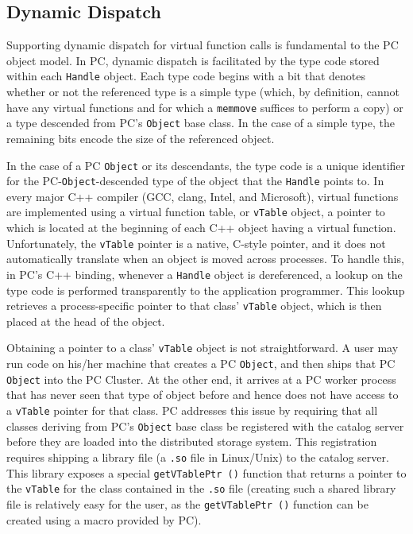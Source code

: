 \subsection{Dynamic Dispatch}
\label{sec:dyn_dis}

Supporting dynamic dispatch for virtual function calls is fundamental to the PC object model.
In PC, dynamic dispatch is facilitated by the type code stored within each
\texttt{Handle} object.
Each type code begins with a bit that denotes whether or not the referenced type is a simple type (which, by definition, cannot have any
virtual functions and for which a \texttt{memmove} suffices to perform a copy) or a type descended from PC's \texttt{Object} base class.
In the case of a simple type, the remaining bits encode the size of the referenced object.  

In the case of a PC \texttt{Object} or its descendants, the
type code is a unique identifier for the PC-\texttt{Object}-descended type of the object that the \texttt{Handle} points to.
In every major C++ compiler (GCC, clang, Intel, and Microsoft), virtual functions
are implemented using a virtual function table, or \texttt{vTable} object, a pointer to which is located at the beginning
of each C++ object having a virtual function.  Unfortunately, the
\texttt{vTable} pointer is a native, C-style pointer, and it does not automatically translate when an
object is moved across processes.  To handle this, in
PC's C++ binding, whenever a \texttt{Handle} object is dereferenced, 
a lookup on the
type code is performed transparently to the application programmer.  This lookup retrieves a process-specific pointer to that class' \texttt{vTable} object, which is
then placed at the head of the object.

Obtaining a pointer to a class' \texttt{vTable} object is not straightforward.
A user may run code on his/her machine that creates
a PC \texttt{Object}, and then ships that PC \texttt{Object} into the
PC Cluster.  At the other end, it arrives at a PC worker process that has never seen that type of object before and hence
does not have access to a \texttt{vTable} pointer for that class.
PC addresses this issue by requiring that all classes deriving from PC's \texttt{Object} base class be registered with the catalog
server before they are loaded into the distributed storage system.  This registration requires shipping a library file (a \texttt{.so} file in Linux/Unix) to
the catalog server.  This library exposes a special \texttt{getVTablePtr ()} function that returns a pointer to the \texttt{vTable} for the class contained
in the \texttt{.so} file (creating such
a shared library file is relatively easy for the user, as the \texttt{getVTablePtr ()} function can be created using a macro provided by PC).

